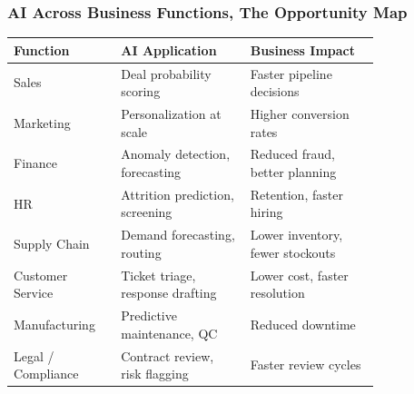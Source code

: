 \begin{frame}[fragile]\frametitle{AI Across Business Functions, The Opportunity Map}

\begin{center}
\begin{tabular}{|p{0.2\linewidth}|p{0.3\linewidth}|p{0.3\linewidth}|}
\hline
\textbf{Function} & \textbf{AI Application} & \textbf{Business Impact} \\
\hline
Sales & Deal probability scoring & Faster pipeline decisions \\
Marketing & Personalization at scale & Higher conversion rates \\
Finance & Anomaly detection, forecasting & Reduced fraud, better planning \\
HR & Attrition prediction, screening & Retention, faster hiring \\
Supply Chain & Demand forecasting, routing & Lower inventory, fewer stockouts \\
Customer Service & Ticket triage, response drafting & Lower cost, faster resolution \\
Manufacturing & Predictive maintenance, QC & Reduced downtime \\
Legal / Compliance & Contract review, risk flagging & Faster review cycles \\
\hline
\end{tabular}
\end{center}

\end{frame}

